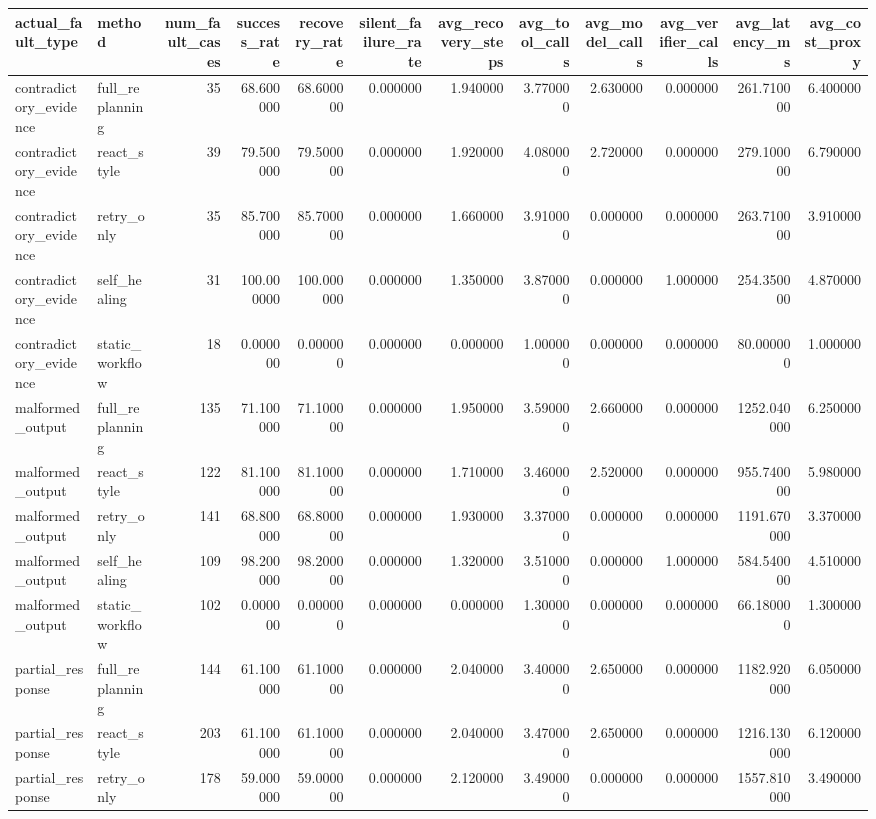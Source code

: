 \begin{tabular}{llrrrrrrrrrr}
\toprule
actual_fault_type & method & num_fault_cases & success_rate & recovery_rate & silent_failure_rate & avg_recovery_steps & avg_tool_calls & avg_model_calls & avg_verifier_calls & avg_latency_ms & avg_cost_proxy \\
\midrule
contradictory_evidence & full_replanning & 35 & 68.600000 & 68.600000 & 0.000000 & 1.940000 & 3.770000 & 2.630000 & 0.000000 & 261.710000 & 6.400000 \\
contradictory_evidence & react_style & 39 & 79.500000 & 79.500000 & 0.000000 & 1.920000 & 4.080000 & 2.720000 & 0.000000 & 279.100000 & 6.790000 \\
contradictory_evidence & retry_only & 35 & 85.700000 & 85.700000 & 0.000000 & 1.660000 & 3.910000 & 0.000000 & 0.000000 & 263.710000 & 3.910000 \\
contradictory_evidence & self_healing & 31 & 100.000000 & 100.000000 & 0.000000 & 1.350000 & 3.870000 & 0.000000 & 1.000000 & 254.350000 & 4.870000 \\
contradictory_evidence & static_workflow & 18 & 0.000000 & 0.000000 & 0.000000 & 0.000000 & 1.000000 & 0.000000 & 0.000000 & 80.000000 & 1.000000 \\
malformed_output & full_replanning & 135 & 71.100000 & 71.100000 & 0.000000 & 1.950000 & 3.590000 & 2.660000 & 0.000000 & 1252.040000 & 6.250000 \\
malformed_output & react_style & 122 & 81.100000 & 81.100000 & 0.000000 & 1.710000 & 3.460000 & 2.520000 & 0.000000 & 955.740000 & 5.980000 \\
malformed_output & retry_only & 141 & 68.800000 & 68.800000 & 0.000000 & 1.930000 & 3.370000 & 0.000000 & 0.000000 & 1191.670000 & 3.370000 \\
malformed_output & self_healing & 109 & 98.200000 & 98.200000 & 0.000000 & 1.320000 & 3.510000 & 0.000000 & 1.000000 & 584.540000 & 4.510000 \\
malformed_output & static_workflow & 102 & 0.000000 & 0.000000 & 0.000000 & 0.000000 & 1.300000 & 0.000000 & 0.000000 & 66.180000 & 1.300000 \\
partial_response & full_replanning & 144 & 61.100000 & 61.100000 & 0.000000 & 2.040000 & 3.400000 & 2.650000 & 0.000000 & 1182.920000 & 6.050000 \\
partial_response & react_style & 203 & 61.100000 & 61.100000 & 0.000000 & 2.040000 & 3.470000 & 2.650000 & 0.000000 & 1216.130000 & 6.120000 \\
partial_response & retry_only & 178 & 59.000000 & 59.000000 & 0.000000 & 2.120000 & 3.490000 & 0.000000 & 0.000000 & 1557.810000 & 3.490000 \\

\end{tabular}
